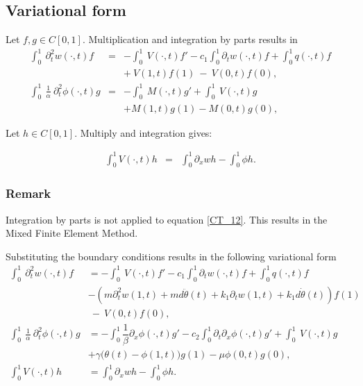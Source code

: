 \documentclass[../../main.tex]{subfiles}
\begin{document}
\subsection{Variational form}
Let $f,g \in C[0,1]$. Multiplication and integration by parts results in
\begin{eqnarray}
\int_0^1~ \partial^2_t w(\cdot,t) f &=&  - \int_0^1~ V(\cdot,t)f' - c_1\int_0^1 \partial_t w(\cdot,t)f + \int_0^1q(\cdot,t)f \nonumber \\
& &+~V(1,t)f(1)~-~V(0,t)f(0), \label{CT_10}\\
 \int_0^1~ \frac{1}{\alpha}~\partial^2_t \phi(\cdot,t) g  &=& -\int_0^1~M(\cdot,t)g' + \int_0^1~ V(\cdot,t)g \nonumber\\
& & + M(1,t)g(1) -  M(0,t)g(0), \label{CT_11}
\end{eqnarray}

Let $h \in C[0,1]$. Multiply and integration gives:

\begin{eqnarray}
 \int_0^1 V(\cdot,t)h &=& \int_0^1 \partial_x wh - \int_0^1\phi h. \label{CT_12}
\end{eqnarray}

\subsubsection{Remark}
Integration by parts is not applied to equation \eqref{CT_12}. This results in the Mixed Finite Element Method.

Substituting the boundary conditions results in the following variational form
\begin{align}
\int_0^1~ \partial^2_t w(\cdot,t) f &=  - \int_0^1~ V(\cdot,t)f' - c_1\int_0^1 \partial_t w(\cdot,t)f + \int_0^1q(\cdot,t)f \nonumber \\
&  -(m \partial_t^2 w(1,t) +  md \ddot \theta(t) + k_1 \partial_t w(1,t)+ k_1 d \dot \theta(t))f(1) \nonumber\\
&~-~V(0,t)f(0), \label{CT_13}\\
 \int_0^1~ \frac{1}{\alpha}~\partial^2_t \phi(\cdot,t) g & = -\int_0^1\dfrac{1}{\beta} \partial_x \phi(\cdot,t)g' - c_2 \int_0^1 \partial_t \partial_x \phi(\cdot,t)g' +\int_0^1~V(\cdot,t)g \nonumber\\
 &  +\gamma \big(\theta(t) - \phi(1,t)\big)g(1) - \mu \phi(0,t)g(0), \label{CT_14}\\
 \int_0^1 V(\cdot,t)h &= \int_0^1 \partial_x wh - \int_0^1\phi h. \label{CT_15}
\end{align}
\end{document}
